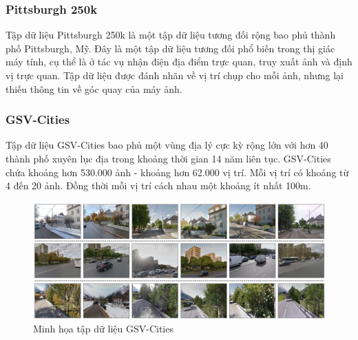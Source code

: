 \subsubsection*{Pittsburgh 250k \cite{6618963}}
Tập dữ liệu Pittsburgh 250k \cite{6618963} là một tập dữ liệu tương đối rộng bao phủ thành phố Pittsburgh, Mỹ. Đây là một tập dữ liệu tương đối phổ biến trong thị giác máy tính, cụ thể là ở tác vụ nhận điện địa điểm trực quan, truy xuất ảnh và định vị trực quan. Tập dữ liệu được đánh nhãn về vị trí chụp cho mỗi ảnh, nhưng lại thiếu thông tin về góc quay của máy ảnh.

\subsubsection*{GSV-Cities \cite{Ali_bey_2022}}
Tập dữ liệu GSV-Cities \cite{Ali_bey_2022} bao phủ một vùng địa lý cực kỳ rộng lớn với hơn 40 thành phố xuyên lục địa trong khoảng thời gian 14 năm liên tục. GSV-Cities chứa khoảng hơn 530.000 ảnh - khoảng hơn 62.000 vị trí. Mỗi vị trí có khoảng từ 4 đến 20 ảnh. Đồng thời mỗi vị trí cách nhau một khoảng ít nhất 100m.
\begin{figure}[H]
    \centering
    \includegraphics[width=\textwidth]{pics/Chapter2/gsv.png}
    \caption{Minh họa tập dữ liệu GSV-Cities \cite{Ali_bey_2022}}
\end{figure}


